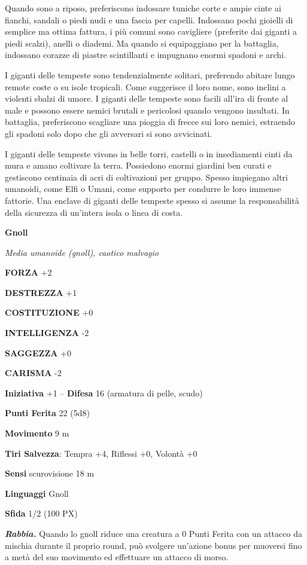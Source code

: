 \begin{multicols}{2}
	Quando sono a riposo, preferiscono indossare tuniche corte e ampie cinte ai fianchi, sandali o piedi nudi e una fascia per capelli. Indossano pochi gioielli di semplice ma ottima fattura, i più comuni sono cavigliere (preferite dai giganti a piedi scalzi), anelli o diademi. Ma quando si equipaggiano per la battaglia, indossano corazze di piastre scintillanti e impugnano enormi spadoni e archi.

	I giganti delle tempeste sono tendenzialmente solitari, preferendo abitare lungo remote coste o su isole tropicali. Come suggerisce il loro nome, sono inclini a violenti sbalzi di umore. I giganti delle tempeste sono facili all'ira di fronte al male e possono essere nemici brutali e pericolosi quando vengono insultati. In battaglia, preferiscono scagliare una pioggia di frecce sui loro nemici, estraendo gli spadoni solo dopo che gli avversari si sono avvicinati.

	I giganti delle tempeste vivono in belle torri, castelli o in insediamenti cinti da mura e amano coltivare la terra. Possiedono enormi giardini ben curati e gestiscono centinaia di acri di coltivazioni per gruppo. Spesso impiegano altri umanoidi, come Elfi o Umani, come supporto per condurre le loro immense fattorie. Una enclave di giganti delle tempeste spesso si assume la responsabilità della sicurezza di un'intera isola o linea di costa.

	\medskip{}\textbf{Gnoll}

	\textit{Media umanoide (gnoll), caotico malvagio}

	\textbf{FORZA} +2

	\textbf{DESTREZZA} +1

	\textbf{COSTITUZIONE} +0

	\textbf{INTELLIGENZA} -2

	\textbf{SAGGEZZA} +0

	\textbf{CARISMA} -2

	\textbf{Iniziativa} +1 -- \textbf{Difesa} 16 (armatura di pelle, scudo)

	\textbf{Punti Ferita} 22 (5d8)

	\textbf{Movimento} 9 m

	\textbf{Tiri Salvezza}: Tempra +4, Riflessi +0, Volontà +0

	\textbf{Sensi} scurovisione 18 m

	\textbf{Linguaggi} Gnoll

	\textbf{Sfida} 1/2 (100 PX)

	\textit{\textbf{Rabbia.}} Quando lo gnoll riduce una creatura a 0 Punti Ferita con un attacco da mischia durante il proprio round, può svolgere un'azione bonus per muoversi fino a metà del suo movimento ed effettuare un attacco di morso.


\end{multicols}
